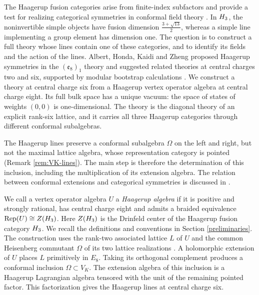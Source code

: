 \documentclass[leqno]{article}
\let\cal\relax
\newcommand{\cal}{\mathcal}
\DeclareMathOperator{\Rep}{Rep}
\numberwithin{equation}{section}
\begin{document}
The Haagerup fusion categories arise from finite-index subfactors and provide a test for realizing categorical symmetries in conformal field theory \cite[Section II]{AHKZ26}. In $\cal H_3$, the noninvertible simple objects have fusion dimension $\frac{3+\sqrt{13}}2$, whereas a simple line implementing a group element has dimension one. The question is to construct a full theory whose lines contain one of these categories, and to identify its fields and the action of the lines. Albert, Honda, Kaidi and Zheng proposed Haagerup symmetries in the $(\mathfrak e_8)_1$ theory and suggested related theories at central charges two and six, supported by modular bootstrap calculations \cite[Section III pp.~4--5]{AHKZ26}. We construct a theory at central charge six from a Haagerup vertex operator algebra at central charge eight. Its full bulk space has a unique vacuum: the space of states of weights $(0,0)$ is one-dimensional. The theory is the diagonal theory of an explicit rank-six lattice, and it carries all three Haagerup categories through different conformal subalgebras.

The Haagerup lines preserve a conformal subalgebra $\Omega$ on the left and right, but not the maximal lattice algebra, whose representation category is pointed (Remark \ref{rem:VK-lines}). The main step is therefore the determination of this inclusion, including the multiplication of its extension algebra. The relation between conformal extensions and categorical symmetries is discussed in \cite[Sections 7.1--7.4]{MoR24}.

We call a vertex operator algebra $U$ a \emph{Haagerup algebra} if it is positive and strongly rational, has central charge eight and admits a braided equivalence $\Rep(U) \cong Z(\cal H_3)$. Here $Z(\cal H_3)$ is the Drinfeld center of the Haagerup fusion category $\cal H_3$. We recall the definitions and conventions in Section \ref{preliminaries}. The construction uses the rank-two associated lattice $L$ of $U$ and the common Heisenberg commutant $\Omega$ of its two lattice realizations \cite[Section 12]{Arh26a}. A holomorphic extension of $U$ places $L$ primitively in $E_8$. Taking its orthogonal complement produces a conformal inclusion $\Omega \subset V_K$. The extension algebra of this inclusion is a Haagerup Lagrangian algebra tensored with the unit of the remaining pointed factor. This factorization gives the Haagerup lines at central charge six.
\end{document}
